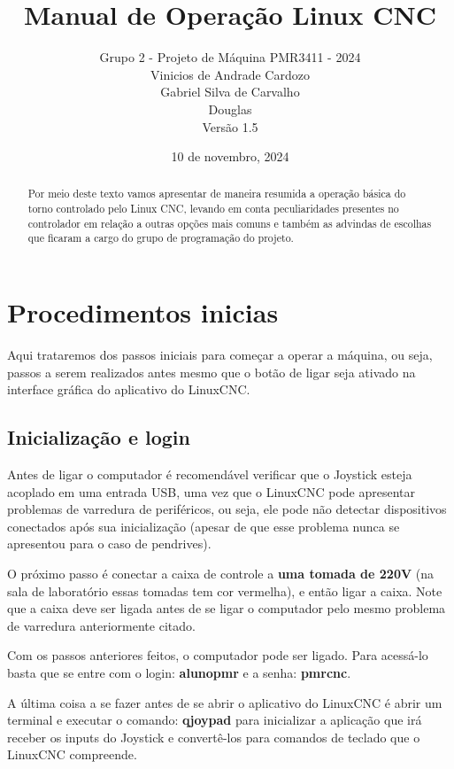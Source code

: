 \documentclass[twoside,a4paper]{refart}
\title{Manual de Operação Linux CNC}
\author{Grupo 2 - Projeto de Máquina PMR3411 - 2024 \\
Vinicios de Andrade Cardozo \\
Gabriel Silva de Carvalho  \\
Douglas \\
Versão 1.5}
\date{10 de novembro, 2024}
\begin{document}
\maketitle

\begin{abstract}
Por meio deste texto vamos apresentar de maneira resumida a operação básica do torno controlado pelo Linux CNC, levando em conta peculiaridades presentes no controlador em relação a outras opções mais comuns e também as advindas de escolhas que ficaram a cargo do grupo de programação do projeto.
\end{abstract}

\tableofcontents

\newpage



\section{Procedimentos inicias}

Aqui trataremos dos passos iniciais para começar a operar a máquina, ou seja, passos a serem realizados antes mesmo que o botão de ligar seja ativado na interface gráfica do aplicativo do LinuxCNC. 

\subsection{Inicialização e login}

Antes de ligar o computador é recomendável verificar que o Joystick esteja acoplado em uma entrada USB, uma vez que o LinuxCNC pode apresentar problemas de varredura de periféricos, ou seja, ele pode não detectar dispositivos conectados após sua inicialização (apesar de que esse problema nunca se apresentou para o caso de pendrives).

O próximo passo é conectar a caixa de controle a \textbf{uma tomada de 220V} (na sala de laboratório essas tomadas tem cor vermelha), e então ligar a caixa. Note que a caixa deve ser ligada antes de se ligar o computador pelo mesmo problema de varredura anteriormente citado.

Com os passos anteriores feitos, o computador pode ser ligado. Para acessá-lo basta que se entre com o login: \textbf{alunopmr} e a senha: \textbf{pmrcnc}. 

A última coisa a se fazer antes de se abrir o aplicativo do LinuxCNC é abrir um terminal e executar o comando: \textbf{qjoypad} para inicializar a aplicação que irá receber os inputs do Joystick e convertê-los para comandos de teclado que o LinuxCNC compreende. 
\end{document}
